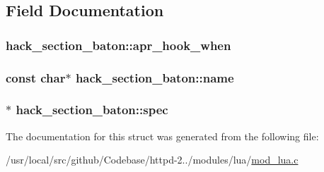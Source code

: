 \subsection{Field Documentation}
\subsubsection[{\texorpdfstring{apr\+\_\+hook\+\_\+when}{apr_hook_when}}]{ hack\+\_\+section\+\_\+baton\+::apr\+\_\+hook\+\_\+when}\hypertarget{structhack__section__baton_aa46ffb28500c3e892a61fa60c8373dcf}{}\label{structhack__section__baton_aa46ffb28500c3e892a61fa60c8373dcf}
\subsubsection[{\texorpdfstring{name}{name}}]{\setlength{\rightskip}{0pt plus 5cm}const char$\ast$ hack\+\_\+section\+\_\+baton\+::name}\hypertarget{structhack__section__baton_a1bf2d5dfb68dcda17a887fb0c8b44d94}{}\label{structhack__section__baton_a1bf2d5dfb68dcda17a887fb0c8b44d94}
\subsubsection[{\texorpdfstring{spec}{spec}}]{$\ast$ hack\+\_\+section\+\_\+baton\+::spec}\hypertarget{structhack__section__baton_ae1dfa2c050ede2c788637d40917ebd6a}{}\label{structhack__section__baton_ae1dfa2c050ede2c788637d40917ebd6a}


The documentation for this struct was generated from the following file\+:\begin{DoxyCompactItemize}
\item 
/usr/local/src/github/\+Codebase/httpd-\/2../modules/lua/\hyperlink{mod__lua_8c}{mod\+\_\+lua.\+c}\end{DoxyCompactItemize}
